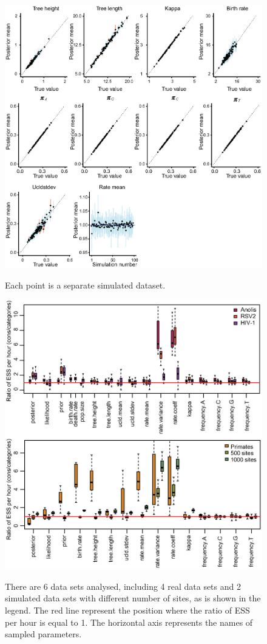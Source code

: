 \documentclass{bmcart}
\begin{document}
\begin{backmatter}
\begin{figure}[h!]
\includegraphics[width=12cm]{Fig09-calibrated.eps}\\
\caption{ Each point is a separate simulated dataset.
             }
\label{LargeTree}
\end{figure}

\begin{figure}[h!]
\includegraphics[width=12cm]{Fig10-efficiencycompare.eps}\\
\caption{
                   There are 6 data sets analysed, including 4 real data sets and 2 simulated data sets with different number of sites, as is shown in the legend. The red line represent the position where the ratio of ESS per hour is equal to 1. The horizontal axis represents the names of sampled parameters.}
\label{eff_comp}
\end{figure}


\end{backmatter}
\end{document}
